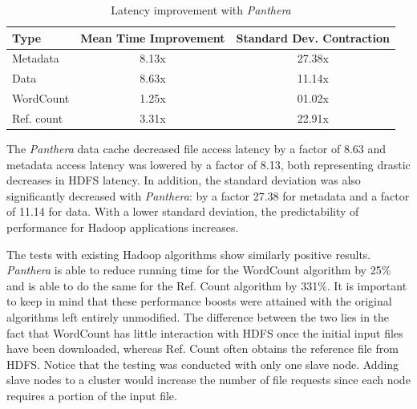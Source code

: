 \documentclass[12pt]{article}
\begin{document}
	\begin{table}
	\centering
			\begin{tabular}{lcc}
			\toprule
			\textbf{Type} & \textbf{Mean Time Improvement} & \textbf{Standard Dev. Contraction} \\
			\midrule
			Metadata   & 8.13x & 27.38x \\
			Data       & 8.63x & 11.14x \\
			WordCount & 1.25x & \phantom01.02x \\
			Ref. count & 3.31x & 22.91x \\
			\bottomrule
			\end{tabular}
		\caption{Latency improvement with \textit{Panthera}}
		\label{results}
	\end{table}

	
The \textit{Panthera} data cache decreased file access latency by a factor of 8.63 and metadata access latency was lowered by a factor of 8.13, both representing drastic decreases in HDFS latency. In addition, the standard deviation was also significantly decreased with \textit{Panthera}: by a factor 27.38 for metadata and a factor of 11.14 for data. With a lower standard deviation, the predictability of performance for Hadoop applications increases.

The tests with existing Hadoop algorithms show similarly positive results. \textit{Panthera} is able to reduce running time for the WordCount algorithm by 25\% and is able to do the same for the Ref. Count algorithm by 331\%. It is important to keep in mind that these performance boosts were attained with the original algorithms left entirely unmodified. The difference between the two lies in the fact that WordCount has little interaction with HDFS once the initial input files have been downloaded, whereas Ref. Count often obtains the reference file from HDFS. Notice that the testing was conducted with only one slave node. Adding slave nodes to a cluster would increase the number of file requests since each node requires a portion of the input file. 
\end{document}
